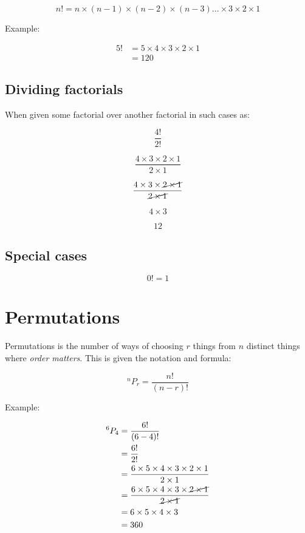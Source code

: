 \documentclass{book}
\begin{document}
\[
	n! = n \times (n-1) \times (n-2) \times (n-3)... \times 3 \times 2 \times 1
\]

Example:

\begin{align*}
	5! & = 5 \times 4 \times 3 \times 2 \times 1 \\
	   & = 120
\end{align*}



\section{Dividing factorials}
When given some factorial over another factorial in such cases as:

\[
	\frac{4!}{2!}
\]

\[
	\frac{4 \times 3 \times 2 \times 1}{2 \times 1}
\]

\[
	\frac{4 \times 3 \times \cancel{2 \times 1}}{\cancel{2 \times 1}}
\]

\[
	4 \times 3
\]

\[
	12
\]



\section{Special cases}
\[
	0! = 1
\]




\chapter{Permutations}
Permutations is the number of ways of choosing $r$ things from $n$ distinct things where \emph{order matters}.  This is given the notation and formula:

\[
	^nP_r = \frac{n!}{(n-r)!}
\]

Example:

\begin{align*}
	^6P_4 & = \frac{6!}{(6 - 4)!}                                                                 \\
	      & = \frac{6!}{2!}                                                                       \\
	      & = \frac{6 \times 5 \times 4 \times 3 \times 2 \times 1}{2 \times 1}                   \\
	      & = \frac{6 \times 5 \times 4 \times 3 \times \cancel{2 \times 1}}{\cancel{2 \times 1}} \\
	      & = 6 \times 5 \times 4 \times 3                                                        \\
	      & = 360
\end{align*}
\end{document}
